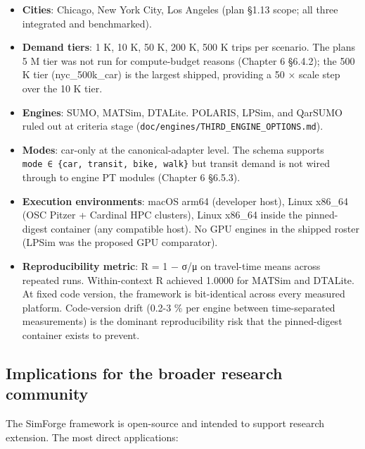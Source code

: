 \begin{itemize}
\tightlist
\item
  \textbf{Cities}: Chicago, New York City, Los Angeles (plan §1.13
  scope; all three integrated and benchmarked).
\item
  \textbf{Demand tiers}: 1 K, 10 K, 50 K, 200 K, 500 K trips per
  scenario. The plan\textquotesingle s 5 M tier was not run for
  compute-budget reasons (Chapter 6 §6.4.2); the 500 K tier
  (nyc\_500k\_car) is the largest shipped, providing a 50 × scale step
  over the 10 K tier.
\item
  \textbf{Engines}: SUMO, MATSim, DTALite. POLARIS, LPSim, and QarSUMO
  ruled out at criteria stage
  (\texttt{doc/engines/THIRD\_ENGINE\_OPTIONS.md}).
\item
  \textbf{Modes}: car-only at the canonical-adapter level. The schema
  supports \texttt{mode\ ∈\ \{car,\ transit,\ bike,\ walk\}} but transit
  demand is not wired through to engine PT modules (Chapter 6 §6.5.3).
\item
  \textbf{Execution environments}: macOS arm64 (developer host), Linux
  x86\_64 (OSC Pitzer + Cardinal HPC clusters), Linux x86\_64 inside the
  pinned-digest container (any compatible host). No GPU engines in the
  shipped roster (LPSim was the proposed GPU comparator).
\item
  \textbf{Reproducibility metric}: R = 1 − σ/μ on travel-time means
  across repeated runs. Within-context R achieved 1.0000 for MATSim and
  DTALite. At fixed code version, the framework is bit-identical across
  every measured platform. Code-version drift (0.2-3 \% per engine
  between time-separated measurements) is the dominant reproducibility
  risk that the pinned-digest container exists to prevent.
\end{itemize}

\subsection{Implications for the broader research
community}\label{154-implications-for-the-broader-research-community}

The SimForge framework is open-source and intended to support research
extension. The most direct applications:

